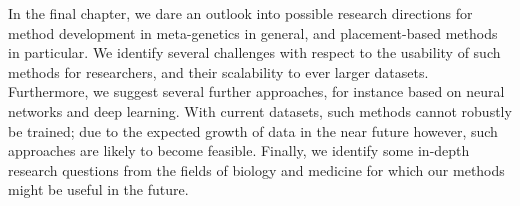 In the final chapter, we dare an outlook into possible research directions for method development in meta-genetics
in general, and placement-based methods in particular.
We identify several challenges with respect to the usability of such methods for researchers,
and their scalability to ever larger datasets.
Furthermore, we suggest several further approaches, for instance based on neural networks and deep learning.
With current datasets, such methods cannot robustly be trained;
due to the expected growth of data in the near future however, such approaches are likely to become feasible.
Finally, we identify some in-depth research questions from the fields of biology and medicine
for which our methods might be useful in the future.



%
%

